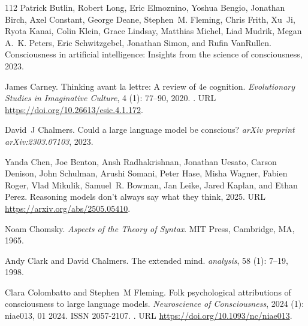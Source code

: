 \begin{thebibliography}{112}
Patrick Butlin, Robert Long, Eric Elmoznino, Yoshua Bengio, Jonathan Birch, Axel Constant, George Deane, Stephen~M. Fleming, Chris Frith, Xu~Ji, Ryota Kanai, Colin Klein, Grace Lindsay, Matthias Michel, Liad Mudrik, Megan A.~K. Peters, Eric Schwitzgebel, Jonathan Simon, and Rufin VanRullen.
\newblock Consciousness in artificial intelligence: Insights from the science of consciousness, 2023.

James Carney.
\newblock Thinking avant la lettre: A review of 4e cognition.
\newblock \emph{Evolutionary Studies in Imaginative Culture}, 4 (1): 77--90, 2020.
\newblock {}.
\newblock URL \url{https://doi.org/10.26613/esic.4.1.172}.

David~J Chalmers.
\newblock Could a large language model be conscious?
\newblock \emph{arXiv preprint arXiv:2303.07103}, 2023.

Yanda Chen, Joe Benton, Ansh Radhakrishnan, Jonathan Uesato, Carson Denison, John Schulman, Arushi Somani, Peter Hase, Misha Wagner, Fabien Roger, Vlad Mikulik, Samuel~R. Bowman, Jan Leike, Jared Kaplan, and Ethan Perez.
\newblock Reasoning models don't always say what they think, 2025.
\newblock URL \url{https://arxiv.org/abs/2505.05410}.

Noam Chomsky.
\newblock \emph{Aspects of the Theory of Syntax}.
\newblock MIT Press, Cambridge, MA, 1965.

Andy Clark and David Chalmers.
\newblock The extended mind.
\newblock \emph{analysis}, 58 (1): 7--19, 1998.

Clara Colombatto and Stephen~M Fleming.
\newblock Folk psychological attributions of consciousness to large language models.
\newblock \emph{Neuroscience of Consciousness}, 2024 (1): niae013, 01 2024.
\newblock ISSN 2057-2107.
\newblock {}.
\newblock URL \url{https://doi.org/10.1093/nc/niae013}.


\end{thebibliography}
